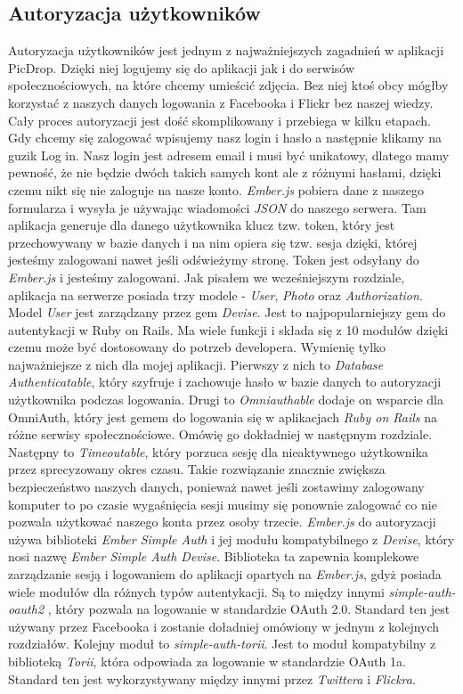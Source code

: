 \documentclass[brudnopis]{xmgr}
\begin{document}
\subsection{Autoryzacja użytkowników}
Autoryzacja użytkowników jest jednym z najważniejszych zagadnień w aplikacji PicDrop. Dzięki niej logujemy się do aplikacji jak i do serwisów społecznościowych, na które chcemy umieścić zdjęcia. Bez niej ktoś obcy mógłby korzystać z naszych danych logowania z Facebooka i Flickr bez naszej wiedzy. Cały proces autoryzacji jest dość skomplikowany i przebiega w kilku etapach. Gdy chcemy się zalogować wpisujemy nasz login i hasło a następnie klikamy na guzik Log in. Nasz login jest adresem email i musi być unikatowy, dlatego mamy pewność, że nie będzie dwóch takich samych kont ale z różnymi hasłami, dzięki czemu nikt się nie zaloguje na nasze konto. \textit{Ember.js} pobiera dane z naszego formularza i wysyła je używając wiadomości \textit{JSON} do naszego serwera. Tam aplikacja generuje dla danego użytkownika klucz tzw. token, który jest przechowywany w bazie danych i na nim opiera się tzw. sesja dzięki, której jesteśmy zalogowani nawet jeśli odświeżymy stronę. Token jest odsyłany do \textit{Ember.js} i jesteśmy zalogowani. \newline \indent Jak pisałem we wcześniejszym rozdziale, aplikacja na serwerze posiada  trzy modele - \textit{User}, \textit{Photo} oraz \textit{Authorization}. Model \textit{User} jest zarządzany przez gem \textit{Devise}. Jest to najpopularniejszy gem do autentykacji w Ruby on Rails. Ma wiele funkcji i składa się z 10 modułów dzięki czemu może być dostosowany do potrzeb developera. Wymienię tylko najważniejsze z nich dla mojej aplikacji. Pierwszy z nich to \textit{Database Authenticatable}, który szyfruje i zachowuje hasło w bazie danych to autoryzacji użytkownika podczas logowania. Drugi to \textit{Omniauthable} dodaje on wsparcie dla OmniAuth, który jest gemem do logowania się w aplikacjach \textit{Ruby on Rails} na różne serwisy społecznościowe. Omówię go dokładniej w następnym rozdziale. Następny to \textit{Timeoutable}, który porzuca sesję dla nieaktywnego użytkownika przez sprecyzowany okres czasu. Takie rozwiązanie znacznie zwiększa bezpieczeństwo naszych danych, ponieważ nawet jeśli zostawimy zalogowany komputer to po czasie wygaśnięcia sesji musimy się ponownie zalogować co nie pozwala użytkować naszego konta przez osoby trzecie.
\newline\indent \textit{Ember.js} do autoryzacji używa biblioteki \textit{Ember Simple Auth} i jej modułu kompatybilnego z \textit{Devise}, który nosi nazwę \textit{Ember Simple Auth Devise}. Biblioteka ta zapewnia komplekowe zarządzanie sesją i logowaniem do aplikacji opartych na \textit{Ember.js}, gdyż posiada wiele modułów dla różnych typów autentykacji. Są to między innymi \textit{simple-auth-oauth2 }, który pozwala na logowanie w standardzie OAuth 2.0. Standard ten jest używany przez Facebooka i zostanie doładniej omówiony w jednym z kolejnych rozdziałów. Kolejny moduł to \textit{simple-auth-torii}. Jest to moduł kompatybilny z biblioteką \textit{Torii}, która odpowiada za logowanie w standardzie OAuth 1a. Standard ten jest wykorzystywany między innymi przez \textit{Twittera} i \textit{Flickra}.
\end{document}
